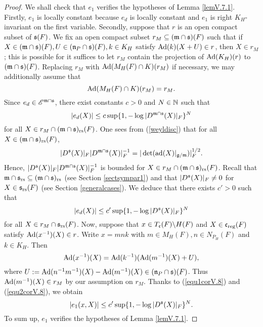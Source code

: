 \documentclass[a4paper]{amsart}
\newcommand{\mse}{\mathscr{E}}\newcommand{\msf}{\mathscr{F}}\newcommand{\msg}{\mathscr{G}}\newcommand{\msh}{\mathscr{H}}
\newcommand{\fm}{{\mathfrak{m}}} \newcommand{\fn}{{\mathfrak{n}}}\newcommand{\fo}{{\mathfrak{o}}} \newcommand{\fp}{{\mathfrak{p}}}
\theoremstyle{definition}
\theoremstyle{remark}
\numberwithin{equation}{subsection}
\begin{document}
\begin{proof}
We shall check that $e_1$ verifies the hypotheses of Lemma \ref{lemV.7.1}. Firstly, $e_1$ is locally constant because $e_d$ is locally constant and $e_1$ is right $K_H$-invariant on the first variable. Secondly, suppose that $r$ is an open compact subset of ${\mathfrak{s}}(F)$. We fix an open compact subset $r_M\subseteq(\fm\cap\fs)(F)$ such that if $X\in(\fm\cap\fs)(F), U\in(\fn_P\cap\fs)(F), k\in K_H$ satisfy ${\mathrm{Ad}}(k)(X+U)\in r$, then $X\in r_M$; this is possible for it suffices to let $r_M$ contain the projection of ${\mathrm{Ad}}(K_H)(r)$ to $(\fm\cap\fs)(F)$. Replacing $r_M$ with ${\mathrm{Ad}}(M_H(F)\cap K)(r_M)$ if necessary, we may additionally assume that
\begin{equation}\label{equ1corV.8}
 {\mathrm{Ad}}(M_H(F)\cap K)(r_M)=r_M. 
\end{equation}
Since $e_d\in\mse^{\fm\cap\fs}$, there exist constants $c>0$ and $N\in{\mathbb {N}}$ such that
$$ |e_d(X)|\leq c\sup\{1, -\log |D^{\fm\cap\fs}(X)|_F\}^N $$
for all $X\in r_M\cap(\fm\cap\fs)_\rs(F)$. 
One sees from (\ref{weyldisc}) that for all $X\in(\fm\cap\fs)_\rs(F)$, 
$$ |D^\fs(X)|_F|D^{\fm\cap\fs}(X)|_F^{-1}=|\det(\ad(X)|_{\fg/\fm})|_F^{1/2}. $$
Hence, $|D^\fs(X)|_F|D^{\fm\cap\fs}(X)|_F^{-1}$ is bounded for $X\in r_M\cap(\fm\cap\fs)_\rs(F)$. 
Recall that $\fm\cap\fs_\rs\subseteq(\fm\cap\fs)_\rs$ (see Section \ref{sectsympar1}) and that $|D^{\mathfrak{s}}(X)|_F\neq0$ for $X\in{\mathfrak{s}}_{\mathrm{rs}}(F)$ (see Section \ref{generalcases}). 
We deduce that there exists $c'>0$ such that
\begin{equation}\label{equ2corV.8}
 |e_d(X)|\leq c'\sup\{1, -\log |D^{\mathfrak{s}}(X)|_F\}^N 
\end{equation}
for all $X\in r_M\cap{\mathfrak{s}}_{\mathrm{rs}}(F)$. Now, suppose that $x\in T_{\mathfrak{c}}(F)\backslash H(F)$ and $X\in{\mathfrak{c}}_{\mathrm{reg}}(F)$ satisfy ${\mathrm{Ad}}(x^{-1})(X)\in r$. Write $x=mnk$ with $m\in M_H(F), n\in N_{P_H}(F)$ and $k\in K_H$. Then
$$ {\mathrm{Ad}}(x^{-1})(X)={\mathrm{Ad}}(k^{-1})({\mathrm{Ad}}(m^{-1})(X)+U), $$
where $U:=\Ad(n^{-1}m^{-1})(X)-\Ad(m^{-1})(X)\in(\fn_P\cap\fs)(F)$. Thus ${\mathrm{Ad}}(m^{-1})(X)\in r_M$ by our assumption on $r_M$. Thanks to (\ref{equ1corV.8}) and (\ref{equ2corV.8}), we obtain
$$ |e_1(x,X)|\leq c'\sup\{1, -\log |D^{\mathfrak{s}}(X)|_F\}^N. $$
To sum up, $e_1$ verifies the hypotheses of Lemma \ref{lemV.7.1}. 


\end{proof}
\end{document}
